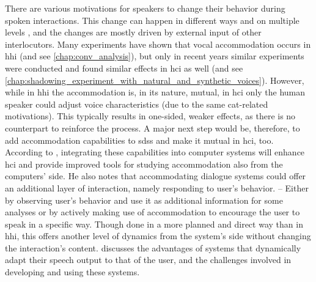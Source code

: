 There are various motivations for speakers to change their behavior during spoken interactions.
This change can happen in different ways and on multiple levels \citep[][and see \cref{chap:phonetic_convergence} for more details]{Gallois2015CAT, Shepard2001CAT}, and the changes are mostly driven by external input of other interlocutors.
Many experiments have shown that vocal accommodation occurs in \ac{hhi} (and see \cref{chap:conv_analysis}), but only in recent years similar experiments were conducted and found similar effects in \ac{hci} as well (and see \cref{chap:shadowing_experiment_with_natural_and_synthetic_voices}).
However, while in \ac{hhi} the accommodation is, in its nature, mutual, in \ac{hci} only the human speaker could adjust voice characteristics (due to the same \ac{cat}-related motivations).
This typically results in one-sided, weaker effects, as there is no counterpart to reinforce the process.
A major next step would be, therefore, to add accommodation capabilities to \acp{sds} and make it mutual in \ac{hci}, too.
According to \citet{Weise2017towards}, integrating these capabilities into computer systems will enhance \ac{hci} and provide improved tools for studying accommodation also from the computers' side.
He also notes that accommodating dialogue systems could offer an additional layer of interaction, namely responding to user's behavior. -- Either by observing user's behavior and use it as additional information for some analyses or by actively making use of accommodation to encourage the user to speak in a specific way.
Though done in a more planned and direct way than in \ac{hhi}, this offers another level of dynamics from the system's side without changing the interaction's content.
\citet{Oviatt2004adaptive} discusses the advantages of systems that dynamically adapt their speech output to that of the user, and the challenges involved in developing and using these systems.

